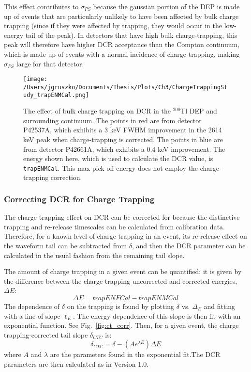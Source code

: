 This effect contributes to $\sigma_{PS}$ because the gaussian portion of the DEP is made up of events that are particularly unlikely to have been affected by bulk charge trapping (since if they were affected by trapping, they would occur in the low-energy tail of the peak). In detectors that have high bulk charge-trapping, this peak will therefore have higher DCR acceptance than the Compton continuum, which is made up of events with a normal incidence of charge trapping, making $\sigma_{PS}$ large for that detector. 

\begin{figure}[]
 \centering
 \texttt{[image: /Users/jgruszko/Documents/Thesis/Plots/Ch3/ChargeTrappingStudy\_trapENMCal.png]}
 \caption[The effect of bulk charge trapping on DCR in the $^{208}$Tl DEP and surrounding continuum.]{The effect of bulk charge trapping on DCR in the $^{208}$Tl DEP and surrounding continuum. The points in red are from detector P42537A, which exhibits a 3 keV FWHM improvement in the 2614 keV peak when charge-trapping is corrected. The points in blue are from detector P42661A, which exhibits a 0.4 keV improvement. The energy shown here, which is used to calculate the DCR value, is {\tt trapENMCal}. This max pick-off energy does not employ the charge-trapping correction.} 
 \label{fig:ct_DCRvE}
\end{figure}

\subsubsection{Correcting DCR for Charge Trapping}
The charge trapping effect on DCR can be corrected for because the distinctive trapping and re-release timescales can be calculated from calibration data. Therefore, for a known level of charge trapping in an event, its re-release effect on the waveform tail can be subtracted from $\delta$, and then the DCR parameter can be calculated in the usual fashion from the remaining tail slope. 

The amount of charge trapping in a given event can be quantified; it is given by the difference between the charge trapping-uncorrected and corrected energies, $\Delta E$:
$$\Delta E =  trapENFCal-trapENMCal $$
The dependence of $\delta$ on the trapping is found by plotting $\delta$ vs. $\Delta_{E}$ and fitting with a line of slope $\ell_{E}$. The energy dependence of this slope is then fit with an exponential function. See Fig.~\ref{fig:ct_corr}. Then, for a given event, the charge trapping-corrected tail slope $\delta_{CTC}$ is:
$$\delta_{CTC} = \delta - (Ae^{\lambda E})\Delta E$$
where $A$ and $\lambda$ are the parameters found in the exponential fit.The DCR parameters are then calculated as in Version 1.0.

